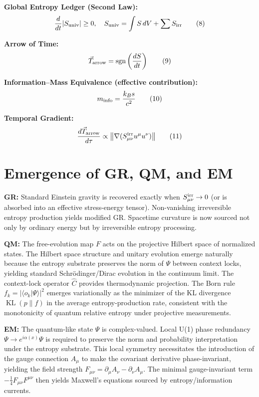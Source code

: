 \documentclass[11pt,letterpaper]{article}
\begin{document}
\textbf{Global Entropy Ledger (Second Law):}
\begin{equation}
\frac{d}{dt} |S_{\rm univ}| \geq 0, \quad S_{\rm univ} = \int S \, dV + \sum S_{\rm irr} \tag{8}
\end{equation}

\textbf{Arrow of Time:}
\begin{equation}
\vec{T}_{\rm arrow} = \operatorname{sgn}\left( \frac{dS}{dt} \right) \tag{9}
\end{equation}

\textbf{Information--Mass Equivalence (effective contribution):}
\begin{equation}
m_{\rm info} = \frac{k_B s}{c^2} \tag{10}
\end{equation}

\textbf{Temporal Gradient:}
\begin{equation}
\frac{d\vec{T}_{\rm arrow}}{d\tau} \propto \bigl\| \nabla (S_{\mu\nu}^{\rm irr} u^\mu u^\nu) \bigr\| \tag{11}
\end{equation}

\section{Emergence of GR, QM, and EM}

\textbf{GR:} Standard Einstein gravity is recovered exactly when \(S_{\mu\nu}^{\rm irr} \to 0\) (or is absorbed into an effective stress-energy tensor). Non-vanishing irreversible entropy production yields modified GR. Spacetime curvature is now sourced not only by ordinary energy but by irreversible entropy processing.

\textbf{QM:} The free-evolution map \(F\) acts on the projective Hilbert space of normalized states. The Hilbert space structure and unitary evolution emerge naturally because the entropy substrate preserves the norm of \(\Psi\) between context locks, yielding standard Schrödinger/Dirac evolution in the continuum limit. The context-lock operator \(\hat{C}\) provides thermodynamic projection. The Born rule \(f_k = |\langle o_k | \Psi \rangle|^2\) emerges variationally as the minimizer of the KL divergence \(\operatorname{KL}(p \| f)\) in the average entropy-production rate, consistent with the monotonicity of quantum relative entropy under projective measurements.

\textbf{EM:} The quantum-like state \(\Psi\) is complex-valued. Local U(1) phase redundancy \(\Psi \to e^{i\alpha(x)} \Psi\) is required to preserve the norm and probability interpretation under the entropy substrate. This local symmetry necessitates the introduction of the gauge connection \(A_\mu\) to make the covariant derivative phase-invariant, yielding the field strength \(F_{\mu\nu} = \partial_\mu A_\nu - \partial_\nu A_\mu\). The minimal gauge-invariant term \(-\frac{1}{4} F_{\mu\nu} F^{\mu\nu}\) then yields Maxwell’s equations sourced by entropy/information currents.
\end{document}
